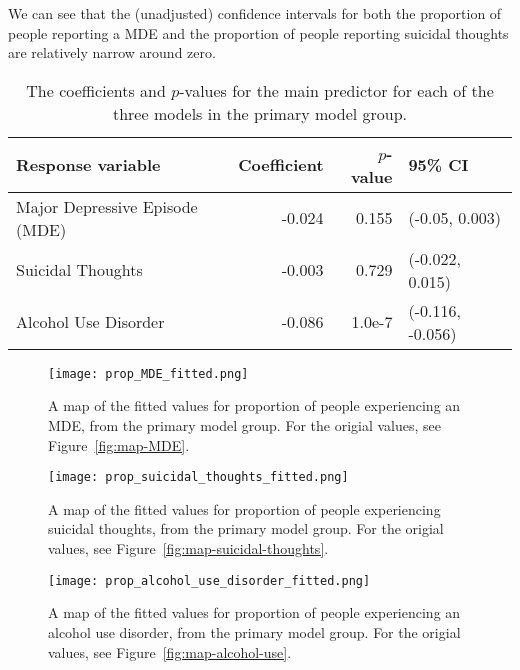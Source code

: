 \documentclass{article}
\begin{document}
We can see that the (unadjusted) confidence intervals for both
the proportion of people reporting a MDE
and the proportion of people reporting suicidal thoughts
are relatively narrow around zero.

\begin{table}[!htb]
\begin{center}
    \begin{tabular}{lrrl}
        \toprule
        Response variable & Coefficient & $p$-value & 95\% CI\\
        \midrule
        Major Depressive Episode (MDE) & -0.024 & 0.155 & (-0.05, 0.003)\\
        Suicidal Thoughts & -0.003 & 0.729 & (-0.022, 0.015)\\
        Alcohol Use Disorder & -0.086 & 1.0e-7 & (-0.116, -0.056)\\
        \bottomrule
    \end{tabular}
\caption{\label{tab:primary-model-results} The coefficients and $p$-values
    for the main predictor for each of the three models
    in the primary model group.
}
\end{center}
\end{table}

\begin{figure}[!htb]
    \centering
    \texttt{[image: prop\_MDE\_fitted.png]}
    \caption{A map of the fitted values for proportion of people experiencing an
    MDE, from the primary model group. For the origial values, see
    Figure~\ref{fig:map-MDE}.}
    \label{fig:map-fitted-MDE}
\end{figure}

\begin{figure}[!htb]
    \centering
    \texttt{[image: prop\_suicidal\_thoughts\_fitted.png]}
    \caption{A map of the fitted values for proportion of people experiencing
    suicidal thoughts, from the primary model group. For the origial values, see
    Figure~\ref{fig:map-suicidal-thoughts}.}
    \label{fig:map-fitted-suicidal-thoughts}
\end{figure}

\begin{figure}[!htb]
    \centering
    \texttt{[image: prop\_alcohol\_use\_disorder\_fitted.png]}
    \caption{A map of the fitted values for proportion of people experiencing an
    alcohol use disorder, from the primary model group.
    For the origial values, see Figure~\ref{fig:map-alcohol-use}.}
    \label{fig:map-fitted-alcohol-use}
\end{figure}
\end{document}
